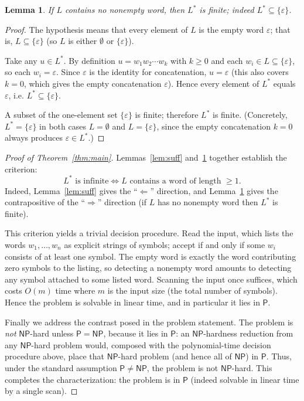 \documentclass{amsart}
\newtheorem{lemma}{Lemma}
\theoremstyle{definition}
\begin{document}
\begin{lemma}\label{lem:nec}
If $L$ contains no nonempty word, then $L^*$ is finite; indeed
$L^* \subseteq \{\varepsilon\}$.
\end{lemma}

\begin{proof}
The hypothesis means that every element of $L$ is the empty word $\varepsilon$;
that is, $L \subseteq \{\varepsilon\}$ (so $L$ is either $\emptyset$ or
$\{\varepsilon\}$).

Take any $u \in L^*$. By definition $u = w_1 w_2 \cdots w_k$ with $k \ge 0$ and
each $w_i \in L \subseteq \{\varepsilon\}$, so each $w_i = \varepsilon$. Since
$\varepsilon$ is the identity for concatenation, $u = \varepsilon$ (this also
covers $k = 0$, which gives the empty concatenation $\varepsilon$). Hence every
element of $L^*$ equals $\varepsilon$, i.e. $L^* \subseteq \{\varepsilon\}$.

A subset of the one-element set $\{\varepsilon\}$ is finite; therefore $L^*$ is
finite. (Concretely, $L^* = \{\varepsilon\}$ in both cases $L = \emptyset$ and
$L = \{\varepsilon\}$, since the empty concatenation $k=0$ always produces
$\varepsilon \in L^*$.)
\end{proof}

\begin{proof}[Proof of Theorem~\ref{thm:main}]
Lemmas~\ref{lem:suff} and~\ref{lem:nec} together establish the criterion:
\[
L^* \text{ is infinite} \iff L \text{ contains a word of length } \ge 1.
\]
Indeed, Lemma~\ref{lem:suff} gives the ``$\Leftarrow$'' direction, and
Lemma~\ref{lem:nec} gives the contrapositive of the ``$\Rightarrow$'' direction
(if $L$ has no nonempty word then $L^*$ is finite).

This criterion yields a trivial decision procedure. Read the input, which lists
the words $w_1,\dots,w_n$ as explicit strings of symbols; accept if and only if
some $w_i$ consists of at least one symbol. The empty word is exactly the word
contributing zero symbols to the listing, so detecting a nonempty word amounts
to detecting any symbol attached to some listed word. Scanning the input once
suffices, which costs $O(m)$ time where $m$ is the input size (the total number
of symbols). Hence the problem is solvable in linear time, and in particular it
lies in $\mathsf{P}$.

Finally we address the contrast posed in the problem statement. The problem is
\emph{not} $\mathsf{NP}$-hard unless $\mathsf{P} = \mathsf{NP}$, because it lies
in $\mathsf{P}$: an $\mathsf{NP}$-hardness reduction from any $\mathsf{NP}$-hard
problem would, composed with the polynomial-time decision procedure above, place
that $\mathsf{NP}$-hard problem (and hence all of $\mathsf{NP}$) in $\mathsf{P}$.
Thus, under the standard assumption $\mathsf{P} \neq \mathsf{NP}$, the problem is
not $\mathsf{NP}$-hard. This completes the characterization: the problem is in
$\mathsf{P}$ (indeed solvable in linear time by a single scan).
\end{proof}
\end{document}
